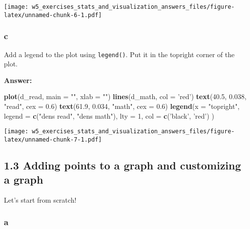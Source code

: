\documentclass[]{article}
\newenvironment{Shaded}{\begin{snugshade}}{\end{snugshade}}
\newcommand{\DataTypeTok}[1]{\textcolor[rgb]{0.13,0.29,0.53}{#1}}
\newcommand{\DecValTok}[1]{\textcolor[rgb]{0.00,0.00,0.81}{#1}}
\newcommand{\FloatTok}[1]{\textcolor[rgb]{0.00,0.00,0.81}{#1}}
\newcommand{\KeywordTok}[1]{\textcolor[rgb]{0.13,0.29,0.53}{\textbf{#1}}}
\newcommand{\NormalTok}[1]{#1}
\newcommand{\StringTok}[1]{\textcolor[rgb]{0.31,0.60,0.02}{#1}}
\begin{document}
\texttt{[image: w5\_exercises\_stats\_and\_visualization\_answers\_files/figure-latex/unnamed-chunk-6-1.pdf]}

\hypertarget{c-1}{%
\subsubsection{c}\label{c-1}}

Add a legend to the plot using \texttt{legend()}. Put it in the topright
corner of the plot.

\textbf{Answer:}

\begin{Shaded}
\begin{Highlighting}[]
\KeywordTok{plot}\NormalTok{(d_read, }\DataTypeTok{main =} \StringTok{""}\NormalTok{, }\DataTypeTok{xlab =} \StringTok{""}\NormalTok{)}
\KeywordTok{lines}\NormalTok{(d_math, }\DataTypeTok{col =} \StringTok{'red'}\NormalTok{)}
\KeywordTok{text}\NormalTok{(}\FloatTok{40.5}\NormalTok{,  }\FloatTok{0.038}\NormalTok{, }\StringTok{"read"}\NormalTok{, }\DataTypeTok{cex =} \FloatTok{0.6}\NormalTok{)}
\KeywordTok{text}\NormalTok{(}\FloatTok{61.9}\NormalTok{, }\FloatTok{0.034}\NormalTok{, }\StringTok{"math"}\NormalTok{, }\DataTypeTok{cex =} \FloatTok{0.6}\NormalTok{)}
\KeywordTok{legend}\NormalTok{(}\DataTypeTok{x =} \StringTok{"topright"}\NormalTok{, }
       \DataTypeTok{legend =} \KeywordTok{c}\NormalTok{(}\StringTok{"dens read"}\NormalTok{, }\StringTok{"dens math"}\NormalTok{), }
       \DataTypeTok{lty =} \DecValTok{1}\NormalTok{, }\DataTypeTok{col =}  \KeywordTok{c}\NormalTok{(}\StringTok{'black'}\NormalTok{, }\StringTok{'red'}\NormalTok{)}
\NormalTok{)}
\end{Highlighting}
\end{Shaded}

\texttt{[image: w5\_exercises\_stats\_and\_visualization\_answers\_files/figure-latex/unnamed-chunk-7-1.pdf]}

\hypertarget{adding-points-to-a-graph-and-customizing-a-graph}{%
\subsection{1.3 Adding points to a graph and customizing a
graph}\label{adding-points-to-a-graph-and-customizing-a-graph}}

Let's start from scratch!

\hypertarget{a-2}{%
\subsubsection{a}\label{a-2}}
\end{document}
